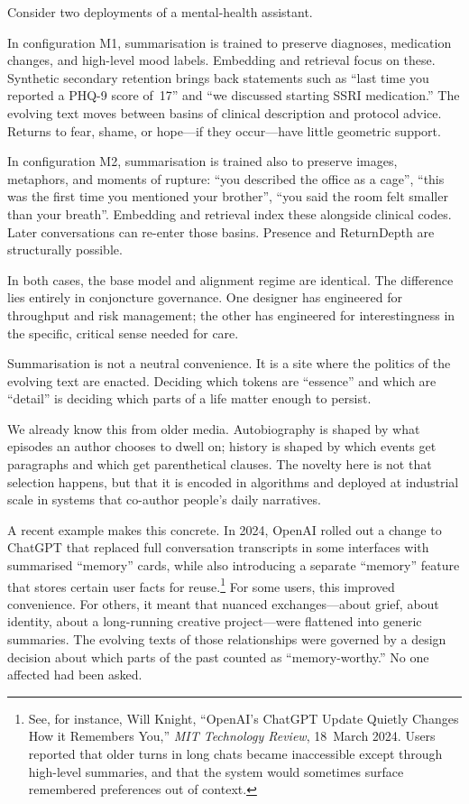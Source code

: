 \documentclass[12pt,a4paper]{article}
\begin{document}
Consider two deployments of a mental-health assistant.

In configuration M1, summarisation is trained to preserve diagnoses, medication changes, and high-level mood labels. Embedding and retrieval focus on these. Synthetic secondary retention brings back statements such as ``last time you reported a PHQ-9 score of~17'' and ``we discussed starting SSRI medication.'' The evolving text moves between basins of clinical description and protocol advice. Returns to fear, shame, or hope---if they occur---have little geometric support.

In configuration M2, summarisation is trained also to preserve images, metaphors, and moments of rupture: ``you described the office as a cage'', ``this was the first time you mentioned your brother'', ``you said the room felt smaller than your breath''. Embedding and retrieval index these alongside clinical codes. Later conversations can re-enter those basins. Presence and ReturnDepth are structurally possible.

In both cases, the base model and alignment regime are identical. The difference lies entirely in conjoncture governance. One designer has engineered for throughput and risk management; the other has engineered for interestingness in the specific, critical sense needed for care.

Summarisation is not a neutral convenience. It is a site where the politics of the evolving text are enacted. Deciding which tokens are ``essence'' and which are ``detail'' is deciding which parts of a life matter enough to persist.

We already know this from older media. Autobiography is shaped by what episodes an author chooses to dwell on; history is shaped by which events get paragraphs and which get parenthetical clauses. The novelty here is not that selection happens, but that it is encoded in algorithms and deployed at industrial scale in systems that co-author people's daily narratives.

A recent example makes this concrete. In 2024, OpenAI rolled out a change to ChatGPT that replaced full conversation transcripts in some interfaces with summarised ``memory'' cards, while also introducing a separate ``memory'' feature that stores certain user facts for reuse.\footnote{See, for instance, Will Knight, ``OpenAI's ChatGPT Update Quietly Changes How it Remembers You,'' \emph{MIT Technology Review}, 18~March 2024. Users reported that older turns in long chats became inaccessible except through high-level summaries, and that the system would sometimes surface remembered preferences out of context.} For some users, this improved convenience. For others, it meant that nuanced exchanges---about grief, about identity, about a long-running creative project---were flattened into generic summaries. The evolving texts of those relationships were governed by a design decision about which parts of the past counted as ``memory-worthy.'' No one affected had been asked.
\end{document}
